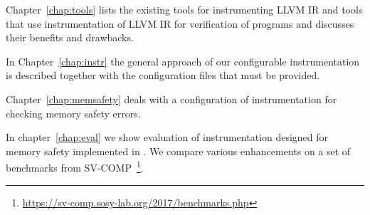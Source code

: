 Chapter~\ref{chap:tools} lists the existing tools for instrumenting LLVM IR and
tools that use instrumentation of LLVM IR for verification of programs and
discusses their benefits and drawbacks.

In Chapter~\ref{chap:instr} the general approach of our configurable
instrumentation is described together with the configuration files that must
be provided.

Chapter~\ref{chap:memsafety} deals with a configuration of instrumentation for
checking memory safety errors.

In chapter~\ref{chap:eval} we show evaluation of instrumentation designed for
memory safety implemented in \symbiotic. We compare various enhancements on a
set of benchmarks from
SV-COMP~\footnote{\url{https://sv-comp.sosy-lab.org/2017/benchmarks.php}}.
